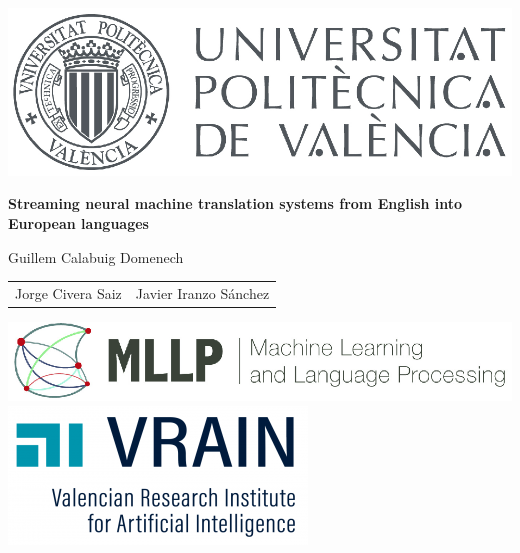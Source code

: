 \documentclass[landscape]{article}
\renewcommand{\author}{Guillem Calabuig Domenech}
\renewcommand{\title}{Streaming neural machine translation systems from English into European languages}
\begin{document}

\thispagestyle{empty}

\begin{center}

\centerline{\includegraphics[height=0.15\textheight]{figures/UPV-logo}}

\rule{0mm}{20mm}
\Large{\Large\textbf{\color{darkred}\title}}

\rule{0mm}{30mm}
{\normalsize \color{greyblue}\author}

\rule{0mm}{0mm}
\begin{table}[ht!]
    \begin{tabularx}{\textwidth}{YY}
        \small \color{greyblue} Jorge Civera Saiz & \small \color{greyblue} Javier Iranzo Sánchez\\
    \end{tabularx}
\end{table}

\end{center}

\centerline{\includegraphics[height=0.12\textheight]{figures/MLLP_Brand} \qquad \qquad \includegraphics[height=0.15\textheight]{figures/vrain.png}}

\normalsize\small
\vspace{10mm}
\end{document}
